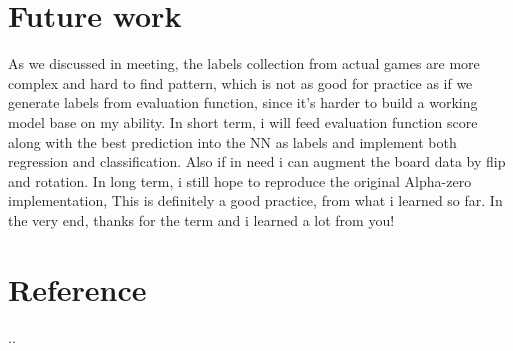 \documentclass[11pt, twocolumn]{article}
\begin{document}
\section{Future work}
As we discussed in meeting, the labels collection from actual games are more complex and hard to find pattern, which is not as good for practice as if we generate labels from evaluation function, since it's harder to build a working model base on my ability.
In short term, i will feed evaluation function score along with the best prediction into the NN as labels and implement both regression and classification. Also if in need i can augment the board data by flip and rotation.
In long term, i still hope to reproduce the original Alpha-zero implementation, This is definitely a good practice, from what i learned so far. In the very end, thanks for the term and i learned a lot from you! 

\section{Reference}
..
\end{document}
